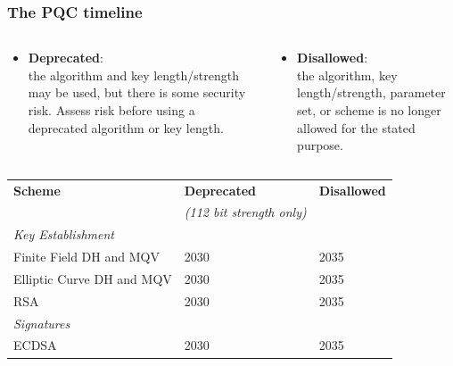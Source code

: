 \documentclass[
aspectratio=169, %
t, %
onlytextwidth, %
10pt, %
]{beamer}
\begin{document}

\begin{frame}
    \frametitle{The PQC timeline}
    \begin{columns}
        \begin{column}{0.5\linewidth} %
            \begin{itemize}
                \item \textbf{Deprecated}: \\the algorithm and key length/strength may be used, but there is some security risk. Assess risk before using a deprecated algorithm or key length.
            \end{itemize}
        \end{column}
        \begin{column}{0.5\linewidth} %
            \begin{itemize}
                \item \textbf{Disallowed}: \\the algorithm, key length/strength, parameter set, or scheme is no longer allowed for the stated purpose.
            \end{itemize}
        \end{column}
    \end{columns}
    \begin{columns}
        \begin{column}{0.58\linewidth} %
        \vspace{-2em}
            \begin{table}[]
                \begin{tabular}{|l|l|l|}
                    \hline
                    \textbf{Scheme} & \textbf{Deprecated} & \textbf{Disallowed} \\
                                    & \textit{(112 bit strength only)}& \\
                    \hline
                    \textit{Key Establishment}&&\\
                    Finite Field DH and MQV & 2030 & 2035 \\
                    Elliptic Curve DH and MQV & 2030 & 2035 \\
                    RSA & 2030 & 2035 \\
                    \hline
                    \textit{Signatures}&&\\
                    ECDSA & 2030 & 2035 \\

\end{tabular}
\end{table}
\end{column}
\end{columns}
\end{frame}
\end{document}
